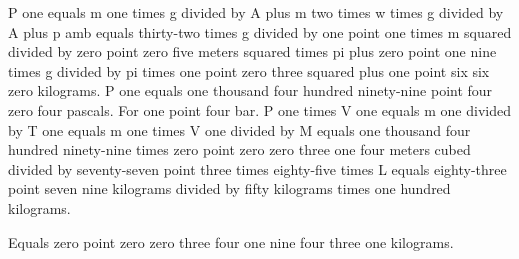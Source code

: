 P one equals m one times g divided by A plus m two times w times g divided by A plus p amb equals thirty-two times g divided by one point one times m squared divided by zero point zero five meters squared times pi plus zero point one nine times g divided by pi times one point zero three squared plus one point six six zero kilograms. P one equals one thousand four hundred ninety-nine point four zero four pascals. For one point four bar. P one times V one equals m one divided by T one equals m one times V one divided by M equals one thousand four hundred ninety-nine times zero point zero zero three one four meters cubed divided by seventy-seven point three times eighty-five times L equals eighty-three point seven nine kilograms divided by fifty kilograms times one hundred kilograms.

Equals zero point zero zero three four one nine four three one kilograms.